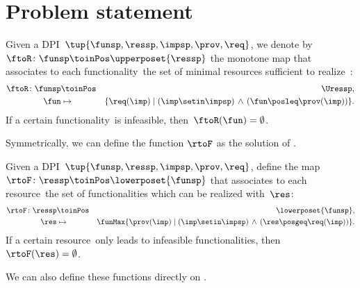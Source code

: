 
\section{Problem statement}
\label{sec:Optimization}


\begin{definition}
    \label{def:ftoR}
    Given a DPI~$\tup{ \funsp,\ressp,\impsp,\prov,\req} $, we denote by~$\ftoR\colon \funsp\toinPos\upperposet{\ressp}$ the monotone map that associates to each functionality~\fun the set of minimal resources sufficient to realize~\fun:
    \begin{equation*}
        \begin{aligned}
            \ftoR\colon \funsp & \toinPos & \Uressp, \\
            \fun               & \mapsto  & \{\req(\imp)\mid\left(\imp\setin\impsp\right)\,\wedge\,\left(\fun\posleq\prov(\imp)\right)\}.
        \end{aligned}
    \end{equation*}
    If a certain functionality~\fun is infeasible, then~$\ftoR(\fun)=\emptyset$.
\end{definition}

Symmetrically, we can define the function $\rtoF$ as the solution of \FixResMaxFun.

\begin{definition}
    \label{def:rtoF}
    Given a DPI~$\tup{ \funsp,\ressp,\impsp,\prov,\req}$, define the map~$\rtoF\colon \ressp\toinPos \lowerposet{\funsp}$ that associates to each resource~\res the set of functionalities which can be realized with~$\res$:
    \begin{equation*}
        \begin{aligned}
            \rtoF\colon \ressp & \toinPos & \lowerposet{\funsp}, \\
            \res               & \mapsto  & \funMax\{\prov(\imp)\mid\left(\imp\setin\impsp\right)\,\wedge\,\left(\res\posgeq\req(\imp)\right)\}.
        \end{aligned}
    \end{equation*}
    If a certain resource~\res only leads to infeasible functionalities, then~$\rtoF(\res)=\emptyset$.
\end{definition}

We can also define these functions directly on \DP.

